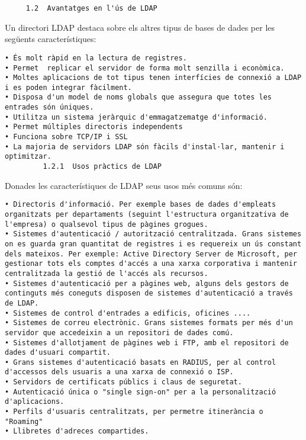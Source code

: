 \documentclass[
  12 pt,
  a4paper,
]{article}
\begin{document}
\begin{verbatim}
     1.2  Avantatges en l'ús de LDAP
\end{verbatim}

Un directori LDAP destaca sobre els altres tipus de bases de dades per
les següents característiques:

\begin{verbatim}
• És molt ràpid en la lectura de registres.
• Permet  replicar el servidor de forma molt senzilla i econòmica.
• Moltes aplicacions de tot tipus tenen interfícies de connexió a LDAP i es poden integrar fàcilment.
• Disposa d'un model de noms globals que assegura que totes les entrades són úniques.
• Utilitza un sistema jeràrquic d'emmagatzematge d'informació.
• Permet múltiples directoris independents
• Funciona sobre TCP/IP i SSL
• La majoria de servidors LDAP són fàcils d'instal·lar, mantenir i optimitzar.  
         1.2.1  Usos pràctics de LDAP
\end{verbatim}

Donades les característiques de LDAP seus usos més comuns són:

\begin{verbatim}
• Directoris d'informació. Per exemple bases de dades d'empleats organitzats per departaments (seguint l'estructura organitzativa de l'empresa) o qualsevol tipus de pàgines grogues.
• Sistemes d'autenticació / autorització centralitzada. Grans sistemes on es guarda gran quantitat de registres i es requereix un ús constant dels mateixos. Per exemple: Active Directory Server de Microsoft, per gestionar tots els comptes d'accés a una xarxa corporativa i mantenir centralitzada la gestió de l'accés als recursos.
• Sistemes d'autenticació per a pàgines web, alguns dels gestors de continguts més coneguts disposen de sistemes d'autenticació a través de LDAP.   
• Sistemes de control d'entrades a edificis, oficines ....
• Sistemes de correu electrònic. Grans sistemes formats per més d'un servidor que accedeixin a un repositori de dades comú.
• Sistemes d'allotjament de pàgines web i FTP, amb el repositori de dades d'usuari compartit.
• Grans sistemes d'autenticació basats en RADIUS, per al control d'accessos dels usuaris a una xarxa de connexió o ISP.  
• Servidors de certificats públics i claus de seguretat.
• Autenticació única o "single sign-on" per a la personalització d'aplicacions.
• Perfils d'usuaris centralitzats, per permetre itinerància o "Roaming"
• Llibretes d'adreces compartides.
\end{verbatim}
\end{document}

